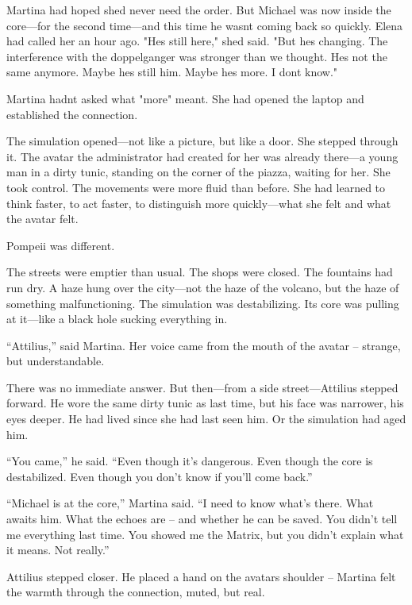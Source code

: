 \documentclass[
]{article}
\begin{document}
Martina had hoped she\textquotesingle d never need the order. But Michael was now inside the core---for the second time---and this time he wasn\textquotesingle t coming back so quickly. Elena had called her an hour ago. "He\textquotesingle s still here," she\textquotesingle d said. "But he\textquotesingle s changing. The interference with the doppelganger was stronger than we thought. He\textquotesingle s not the same anymore. Maybe he\textquotesingle s still him. Maybe he\textquotesingle s more. I don\textquotesingle t know."

Martina hadn\textquotesingle t asked what "more" meant. She had opened the laptop and established the connection.

The simulation opened---not like a picture, but like a door. She stepped through it. The avatar the administrator had created for her was already there---a young man in a dirty tunic, standing on the corner of the piazza, waiting for her. She took control. The movements were more fluid than before. She had learned to think faster, to act faster, to distinguish more quickly---what she felt and what the avatar felt.

Pompeii was different.

The streets were emptier than usual. The shops were closed. The fountains had run dry. A haze hung over the city---not the haze of the volcano, but the haze of something malfunctioning. The simulation was destabilizing. Its core was pulling at it---like a black hole sucking everything in.

``Attilius,'' said Martina. Her voice came from the mouth of the avatar -- strange, but understandable.

There was no immediate answer. But then---from a side street---Attilius stepped forward. He wore the same dirty tunic as last time, but his face was narrower, his eyes deeper. He had lived since she had last seen him. Or the simulation had aged him.

``You came,'' he said. ``Even though it's dangerous. Even though the core is destabilized. Even though you don't know if you'll come back.''

``Michael is at the core,'' Martina said. ``I need to know what's there. What awaits him. What the echoes are -- and whether he can be saved. You didn't tell me everything last time. You showed me the Matrix, but you didn't explain what it means. Not really.''

Attilius stepped closer. He placed a hand on the avatar\textquotesingle s shoulder -- Martina felt the warmth through the connection, muted, but real.
\end{document}
